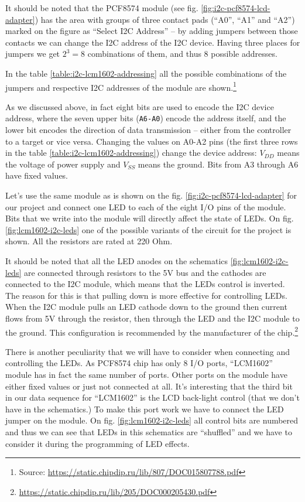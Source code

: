 \documentclass[../sparc.tex]{subfiles}
\begin{document}
It should be noted that the PCF8574 module (see
fig. \ref{fig:i2c-pcf8574-lcd-adapter}) has the area with groups of three
contact pads (``A0'', ``A1'' and ``A2'') marked on the figure as ``Select I2C
Address'' -- by adding jumpers between those contacts we can change the I2C
address of the I2C device.  Having three places for jumpers we get $2^3 = 8$
combinations of them, and thus 8 possible addresses.


In the table \ref{table:i2c-lcm1602-addressing} all the possible combinations of
the jumpers and respective I2C addresses of the module are
shown.\footnote{Source:
\url{https://static.chipdip.ru/lib/807/DOC015807788.pdf}}

As we discussed above, in fact eight bits are used to encode the I2C device
address, where the seven upper bits (\texttt{A6-A0}) encode the address itself,
and the lower bit encodes the direction of data transmission -- either from the
controller to a target or vice versa.  Changing the values on A0-A2 pins (the
first three rows in the table \ref{table:i2c-lcm1602-addressing}) change the
device address: $V_{DD}$ means the voltage of power supply and $V_{SS}$ means
the ground.  Bits from A3 through A6 have fixed values.


Let's use the same module as is shown on the fig.
\ref{fig:i2c-pcf8574-lcd-adapter} for our project and connect one LED to each of
the eight I/O pins of the module.  Bits that we write into the module will
directly affect the state of LEDs.  On fig. \ref{fig:lcm1602-i2c-leds} one of
the possible variants of the circuit for the project is shown.  All the
resistors are rated at 220 Ohm.

It should be noted that all the LED anodes on the schematics
\ref{fig:lcm1602-i2c-leds} are connected through resistors to the 5V bus and the
cathodes are connected to the I2C module, which means that the LEDs control is
inverted.  The reason for this is that pulling down is more effective for
controlling LEDs.  When the I2C module pulls an LED cathode down to the ground
then current flows from 5V through the resistor, then through the LED and the
I2C module to the ground.  This configuration is recommended by the manufacturer
of the chip.\footnote{\url{https://static.chipdip.ru/lib/205/DOC000205430.pdf}}

There is another peculiarity that we will have to consider when connecting and
controlling the LEDs.  As PCF8574 chip has only 8 I/O ports, ``LCM1602'' module
has in fact the same number of ports.  Other ports on the module have either
fixed values or just not connected at all.  It's interesting that the third bit
in our data sequence for ``LCM1602'' is the LCD back-light control (that we
don't have in the schematics.)  To make this port work we have to connect the
LED jumper on the module.  On fig. \ref{fig:lcm1602-i2c-leds} all control bits
are numbered and thus we can see that LEDs in this schematics are ``shuffled''
and we have to consider it during the programming of LED effects.
\end{document}
